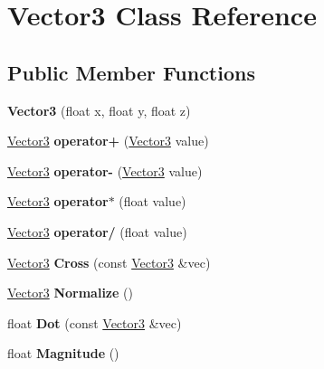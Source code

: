 \hypertarget{class_vector3}{}\section{Vector3 Class Reference}
\label{class_vector3}
\subsection*{Public Member Functions}
\begin{DoxyCompactItemize}
\item 
\mbox{\label{class_vector3_ad53e22b52babdb90d423601f72467590}} 
{\bfseries Vector3} (float x, float y, float z)
\item 
\mbox{\label{class_vector3_a6a854b71c4f3449407b55084b8babf9d}} 
\mbox{\hyperlink{class_vector3}{Vector3}} {\bfseries operator+} (\mbox{\hyperlink{class_vector3}{Vector3}} value)
\item 
\mbox{\label{class_vector3_a991fdefb3666c676986e81e6bc6b5f4d}} 
\mbox{\hyperlink{class_vector3}{Vector3}} {\bfseries operator-\/} (\mbox{\hyperlink{class_vector3}{Vector3}} value)
\item 
\mbox{\label{class_vector3_a368ea66b05c77e7ff5138b3306e2f6ea}} 
\mbox{\hyperlink{class_vector3}{Vector3}} {\bfseries operator$\ast$} (float value)
\item 
\mbox{\label{class_vector3_a8325f1befd63b95c74c1f758d6263f22}} 
\mbox{\hyperlink{class_vector3}{Vector3}} {\bfseries operator/} (float value)
\item 
\mbox{\label{class_vector3_ad82c10e9ea6eb6f707cd1e507f1100d2}} 
\mbox{\hyperlink{class_vector3}{Vector3}} {\bfseries Cross} (const \mbox{\hyperlink{class_vector3}{Vector3}} \&vec)
\item 
\mbox{\label{class_vector3_a8a8cb236aae8602af246f4f56495f159}} 
\mbox{\hyperlink{class_vector3}{Vector3}} {\bfseries Normalize} ()
\item 
\mbox{\label{class_vector3_a96d7aba13eb550ee21bb046788290742}} 
float {\bfseries Dot} (const \mbox{\hyperlink{class_vector3}{Vector3}} \&vec)
\item 
\mbox{\label{class_vector3_a5721d97b9640951b58c40de1a893f966}} 
float {\bfseries Magnitude} ()
\end{DoxyCompactItemize}
